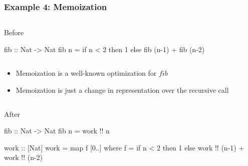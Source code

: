 \documentclass[smaller]{beamer}
\newcommand{\Varid}[1]{\mathit{#1}}
\begin{document}
\begin{frame}[fragile]
\frametitle{Example 4: Memoization}

\begin{columns}[t] 
\begin{column}{0.8\textwidth}
\begin{block}{Before}
{\footnotesize\begin{semiverbatim}
\alert{fib :: Nat -> Nat}
fib n = if n < 2 then 1 else fib (n-1) + fib (n-2)
\end{semiverbatim}}
\end{block}
\end{column}
\end{columns}

\vskip 0.2in
\begin{itemize}
\item Memoization is a well-known optimization for \ensuremath{\Varid{fib}}
\item Memoization is just a change in representation over the recursive call
\end{itemize}
\begin{columns}[t] 
\begin{column}{0.8\textwidth}
\begin{block}{After}
{\footnotesize\begin{semiverbatim}
fib :: Nat -> Nat
fib n = work !! n

\alert{work :: [Nat]}
work = map f [0..]
  where f = if n < 2 then 1 else work !! (n-1) + work !! (n-2)
\end{semiverbatim}}
\end{block}
\end{column}
\end{columns}

\end{frame}
\end{document}
